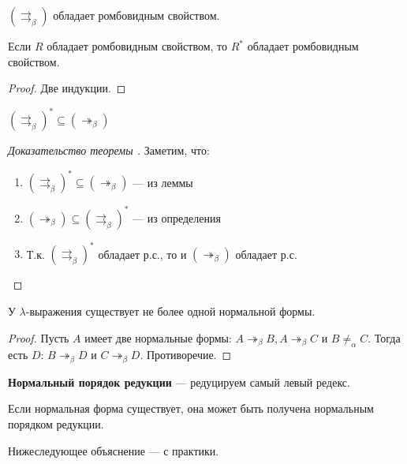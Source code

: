 \begin{lemma}
    \((\rightrightarrows_\beta)\) обладает ромбовидным свойством.
\end{lemma}

\begin{lemma}
    Если \(R\) обладает ромбовидным свойством, то \(R^*\) обладает ромбовидным свойством.
\end{lemma}
\begin{proof}
    Две индукции.
\end{proof}

\begin{lemma}
    \((\rightrightarrows_\beta)^* \subseteq ( \twoheadrightarrow_\beta)\)
\end{lemma}

\begin{proof}[Доказательство теоремы ]
    Заметим, что:
    \begin{enumerate}
        \item \((\rightrightarrows_\beta)^* \subseteq ( \twoheadrightarrow_\beta)\) --- из леммы
        \item \(( \twoheadrightarrow_\beta) \subseteq (\rightrightarrows_\beta)^*\) --- из определения
        \item Т.к. \((\rightrightarrows_\beta)^*\) обладает р.с., то и \(( \twoheadrightarrow_\beta)\) обладает р.с.
    \end{enumerate}
\end{proof}

\begin{corollary}
    У \(\lambda\)-выражения существует не более одной нормальной формы.
\end{corollary}
\begin{proof}
    Пусть \(A\) имеет две нормальные формы: \(A \twoheadrightarrow_\beta B, A \twoheadrightarrow_\beta C\) и \(B \neq_\alpha C\). Тогда есть \(D\): \(B \twoheadrightarrow_\beta D\) и \(C \twoheadrightarrow_\beta D\). Противоречие.
\end{proof}

\begin{definition}
    \textbf{Нормальный порядок редукции} --- редуцируем самый левый редекс.
\end{definition}

\begin{theorem}
    Если нормальная форма существует, она может быть получена нормальным порядком редукции.
\end{theorem}

\begin{remark}
    Нижеследующее объяснение --- с практики.
\end{remark}


